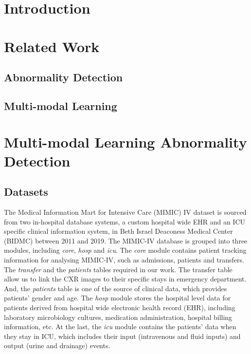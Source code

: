 \documentclass[journal,twoside,web, 11pt]{ieeecolor}
\begin{document}
\doublespacing
\section{Introduction} \label{sec:introduction}



\section{Related Work}
\subsection{Abnormality Detection}
\subsection{Multi-modal Learning}

\section{Multi-modal Learning Abnormality Detection}


\subsection{Datasets}

The Medical Information Mart for Intensive Care (MIMIC) IV dataset \cite{Johnson2021MIMIC_IV} is sourced from two in-hospital database systems, a custom hospital wide EHR and an ICU specific clinical information system, in Beth Israel Deaconess Medical Center (BIDMC) between 2011 and 2019. The MIMIC-IV database is grouped into three modules, including \textit{core}, \textit{hosp} and \textit{icu}. The \textit{core} module contains patient tracking information for analysing MIMIC-IV, such as admissions, patients and transfers. The \textit{transfer} and the \textit{patients} tables required in our work. The transfer table allow us to link the CXR images to their specific stays in emergency department. And, the \textit{patients} table is one of the source of clinical data, which provides patients' gender and age. The \textit{hosp} module stores the hospital level data for patients derived from hospital wide electronic health record (EHR), including laboratory microbiology cultures, medication administration, hospital billing information, etc. At the last, the \textit{icu} module contains the patients' data when they stay in ICU, which includes their input (intravenous and fluid inputs) and output (urine and drainage) events.\\
\\
\end{document}
